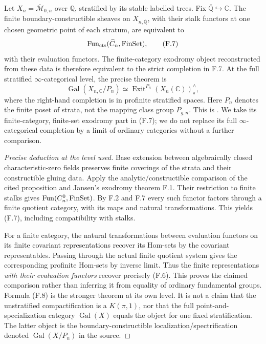 Let $X_n=\overline{\mathscr M}_{0,n}$ over $\mathbb Q$, stratified by its stable labelled trees. Fix $\overline{\mathbb Q}\hookrightarrow\mathbb C$. The finite boundary-constructible \etale sheaves on $X_{n,\overline{\mathbb Q}}$, with their stalk functors at one chosen geometric point of each stratum, are equivalent to
\[
 \operatorname{Fun}_{\mathrm{cts}}(\widehat C_n,\mathrm{FinSet}),                    \tag{F.7}
\]
with their evaluation functors. The finite-category exodromy object reconstructed from these data is therefore equivalent to the strict completion in F.7. At the full stratified $\infty$-categorical level, the precise theorem is
\[
 \operatorname{Gal}(X_{n,\mathbb C}/P_n)
    \simeq\operatorname{Exit}^{P_n}(X_n(\mathbb C))^{\wedge}_{\pi}, \tag{F.8}
\]
where the right-hand completion is in profinite stratified spaces. Here $P_n$ denotes the finite poset of strata, not the mapping class group $P_{g,n}$. This is \citet[Proposition 12.6.4 and Corollaries 12.6.6--12.6.7]{AF_BGH2020}. We take its finite-category, finite-set exodromy part in (F.7); we do not replace its full $\infty$-categorical completion by a limit of ordinary categories without a further comparison.
\begin{proof}[Precise deduction at the level used]
Base extension between algebraically closed characteristic-zero fields preserves finite \etale coverings of the strata and their constructible gluing data. Apply the analytic/\etale constructible comparison of the cited proposition and Jansen's exodromy theorem F.1. Their restriction to finite stalks gives $\operatorname{Fun}(C_n^0,\mathrm{FinSet})$. By F.2 and F.7 every such functor factors through a finite quotient category, with its maps and natural transformations. This yields (F.7), including compatibility with stalks.

For a finite category, the natural transformations between evaluation functors on its finite covariant representations recover its Hom-sets by the covariant representables. Passing through the actual finite quotient system gives the corresponding profinite Hom-sets by inverse limit. Thus the finite representations \emph{with their evaluation functors} recover precisely (F.6). This proves the claimed comparison rather than inferring it from equality of ordinary fundamental groups. Formula (F.8) is the stronger theorem at its own level. It is not a claim that the unstratified compactification is a $K(\pi,1)$, nor that the full point-and-specialization category $\operatorname{Gal}(X)$ equals the object for one fixed stratification. The latter object is the boundary-constructible localization/spectrification denoted $\operatorname{Gal}(X/P_n)$ in the source.
\end{proof}

